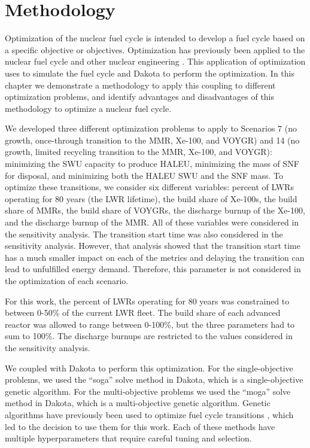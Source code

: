\section{Methodology}
Optimization of the nuclear fuel cycle is intended to develop 
a fuel cycle based on a specific objective or objectives. 
Optimization has previously been applied to the nuclear fuel 
cycle \cite{passerini_sensitivity_2012,andrianov_optimization_2019}
and other nuclear engineering \cite{chee_fluoride-salt-cooled_2022}.
This application of optimization uses \Cyclus \cite{huff_fundamental_2016}
to simulate the fuel cycle and Dakota \cite{adams_dakota_2019} to 
perform the optimization. In this chapter we demonstrate a methodology to 
apply this coupling to different optimization problems, and identify 
advantages and disadvantages of this methodology to optimize a nuclear 
fuel cycle. 

We developed three different optimization problems to apply to 
Scenarios 7 (no growth, once-through transition to the \gls{MMR}, Xe-100, 
and VOYGR) and 14 (no growth, limited recycling transition to the 
\gls{MMR}, Xe-100, and VOYGR): minimizing the \gls{SWU} capacity to 
produce \gls{HALEU}, minimizing the mass of \gls{SNF} for disposal, 
and minimizing both the \gls{HALEU} \gls{SWU} and the \gls{SNF} 
mass. To optimize these transitions, we consider six different 
variables: percent of \glspl{LWR} operating for 80 years (the \gls{LWR} 
lifetime), the build share 
of Xe-100s, the build share of \glspl{MMR}, the build share of VOYGRs, 
the discharge burnup of the Xe-100, and the discharge burnup of the 
\gls{MMR}. All of these variables were considered in the sensitivity 
analysis. The transition start time was also considered in the sensitivity 
analysis. However, that analysis showed that the transition start time has
a much smaller impact on each of the metrics and delaying the transition 
can lead to unfulfilled energy demand. Therefore, this parameter is 
not considered in the optimization of each scenario. 

For this work, the percent of \glspl{LWR} operating for 80 years 
was constrained to between 0-50\% of the current \gls{LWR} fleet. 
The build share of each advanced reactor was allowed to range between 
0-100\%, but the three parameters had to sum to 100\%. The discharge burnups 
are restricted to the values considered in the sensitivity analysis.

We coupled \Cyclus \cite{huff_fundamental_2016} with Dakota 
\cite{adams_dakota_2019} to perform this optimization. For the 
single-objective problems, we used the ``soga'' solve method in 
Dakota, which is a single-objective genetic algorithm. For the 
multi-objective problems we used the ``moga'' solve method in 
Dakota, which is a multi-objective genetic algorithm. Genetic algorithms
have previously been used to optimize fuel cycle transitions 
\cite{passerini_systematic_2014}, which led to the decision to use 
them for this work. Each of these methods have multiple 
hyperparameters that require careful tuning and selection. 

